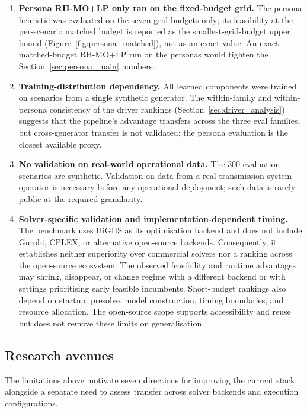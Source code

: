 \documentclass{article}
\begin{document}
\begin{enumerate}[label=\textbf{L\arabic*}, leftmargin=*, itemsep=4pt]
  \item \textbf{Persona RH-MO+LP only ran on the fixed-budget grid.} The persona heuristic was evaluated on the seven grid budgets only; its feasibility at the per-scenario matched budget is reported as the smallest-grid-budget upper bound (Figure~\ref{fig:persona_matched}), not as an exact value. An exact matched-budget RH-MO+LP run on the personas would tighten the Section~\ref{sec:persona_main} numbers.

  \item \textbf{Training-distribution dependency.} All learned components were trained on scenarios from a single synthetic generator. The within-family and within-persona consistency of the driver rankings (Section~\ref{sec:driver_analysis}) suggests that the pipeline's advantage transfers across the three eval families, but cross-generator transfer is not validated; the persona evaluation is the closest available proxy.

  \item \textbf{No validation on real-world operational data.} The $300$ evaluation scenarios are synthetic. Validation on data from a real transmission-system operator is necessary before any operational deployment; such data is rarely public at the required granularity.

  \item \textbf{Solver-specific validation and implementation-dependent timing.} The benchmark uses HiGHS as its optimisation backend and does not include Gurobi, CPLEX, or alternative open-source backends. Consequently, it establishes neither superiority over commercial solvers nor a ranking across the open-source ecosystem. The observed feasibility and runtime advantages may shrink, disappear, or change regime with a different backend or with settings prioritising early feasible incumbents. Short-budget rankings also depend on startup, presolve, model construction, timing boundaries, and resource allocation. The open-source scope supports accessibility and reuse but does not remove these limits on generalisation.
\end{enumerate}


\subsection{Research avenues}
\label{sec:research_avenues}

The limitations above motivate seven directions for improving the current stack, alongside a separate need to assess transfer across solver backends and execution configurations.
\end{document}
